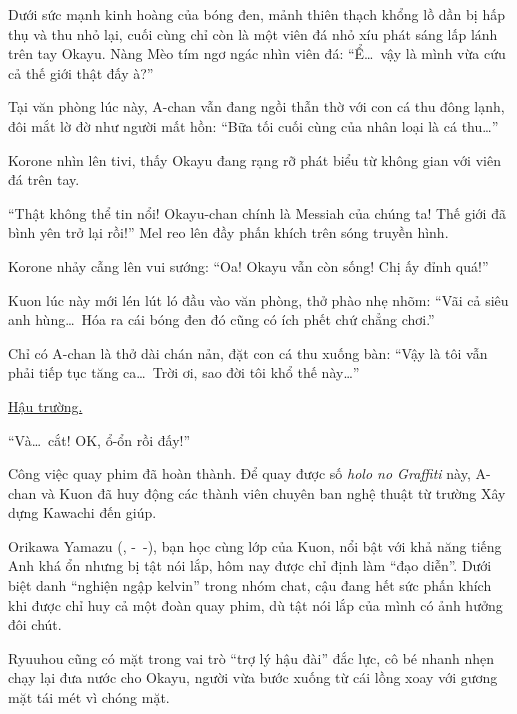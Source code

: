 \documentclass[../main.tex]{subfiles}
\begin{document}

Dưới sức mạnh kinh hoàng của bóng đen, mảnh thiên thạch khổng lồ dần bị hấp thụ và thu nhỏ lại, cuối cùng chỉ còn là một viên đá nhỏ xíu phát sáng lấp lánh trên tay Okayu. Nàng Mèo tím ngơ ngác nhìn viên đá: ``Ể\dots\ vậy là mình vừa cứu cả thế giới thật đấy à?''

\ct

Tại văn phòng lúc này, A-chan vẫn đang ngồi thẫn thờ với con cá thu đông lạnh, đôi mắt lờ đờ như người mất hồn: ``Bữa tối cuối cùng của nhân loại là cá thu\dots''

Korone nhìn lên tivi, thấy Okayu đang rạng rỡ phát biểu từ không gian với viên đá trên tay.

``Thật không thể tin nổi! Okayu-chan chính là Messiah của chúng ta! Thế giới đã bình yên trở lại rồi!'' Mel reo lên đầy phấn khích trên sóng truyền hình.

Korone nhảy cẫng lên vui sướng: ``Oa! Okayu vẫn còn sống! Chị ấy đỉnh quá!''

Kuon lúc này mới lén lút ló đầu vào văn phòng, thở phào nhẹ nhõm: ``Vãi cả siêu anh hùng\dots\ Hóa ra cái bóng đen đó cũng có ích phết chứ chẳng chơi.''

Chỉ có A-chan là thở dài chán nản, đặt con cá thu xuống bàn: ``Vậy là tôi vẫn phải tiếp tục tăng ca\dots\ Trời ơi, sao đời tôi khổ thế này\dots''

\omk

\begin{center}
  \uline{Hậu trường.}
\end{center}

``Và\dots\ cắt! OK, ổ-ổn rồi đấy!''

Công việc quay phim đã hoàn thành. Để quay được số \textit{holo no Graffiti} này, A-chan và Kuon đã huy động các thành viên chuyên ban nghệ thuật từ trường Xây dựng Kawachi đến giúp.

Orikawa Yamazu (, -\ -), bạn học cùng lớp của Kuon, nổi bật với khả năng tiếng Anh khá ổn nhưng bị tật nói lắp, hôm nay được chỉ định làm ``đạo diễn''. Dưới biệt danh ``nghiện ngập kelvin'' trong nhóm chat, cậu đang hết sức phấn khích khi được chỉ huy cả một đoàn quay phim, dù tật nói lắp của mình có ảnh hưởng đôi chút.

Ryuuhou cũng có mặt trong vai trò ``trợ lý hậu đài'' đắc lực, cô bé nhanh nhẹn chạy lại đưa nước cho Okayu, người vừa bước xuống từ cái lồng xoay với gương mặt tái mét vì chóng mặt.
\end{document}
